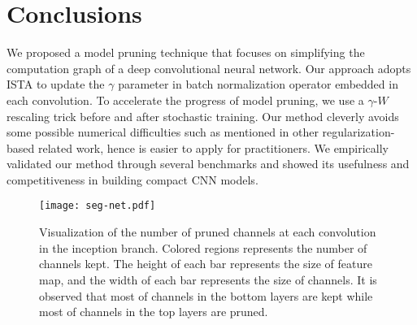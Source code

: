 \documentclass{article} %
\begin{document}
\section{Conclusions}
We proposed a model pruning technique that focuses on simplifying the 
computation graph of a deep convolutional neural network. Our approach adopts
ISTA to update the $\gamma$ parameter in batch normalization operator embedded in
each convolution. To accelerate the progress of model pruning, we use
a $\gamma$-$W$ rescaling trick before and after stochastic training. 
Our method cleverly avoids some possible numerical difficulties such as mentioned
in other regularization-based related work, hence is easier to apply for practitioners. 
We empirically validated our method through several benchmarks and showed its 
usefulness and competitiveness in building compact CNN models. 

\small




\normalsize

\begin{figure}[htp]\centering
\texttt{[image: seg-net.pdf]}
\caption{Visualization of the number of pruned channels at each convolution in
the inception branch. Colored regions represents the number of channels kept.
The height of each bar represents the size of feature map, and the width of each
bar represents the size of channels.
It is observed that most of channels in the bottom layers are kept while most
of channels in the top layers are pruned.}
\end{figure}
\end{document}

